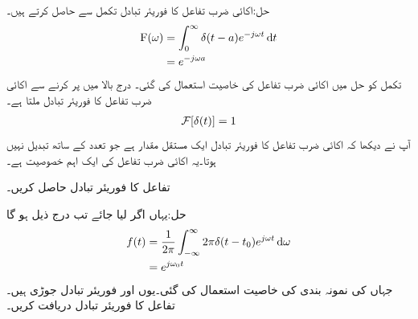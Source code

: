 حل:اکائی ضرب تفاعل کا فوریئر تبادل تکمل سے حاصل کرتے ہیں۔
\begin{gather}
\begin{aligned}
\bF(\omega)&=\int_0^{\infty} \delta(t-a)e^{-j\omega t} \dif t\\
&=e^{-j\omega a}
\end{aligned}
\end{gather}
تکمل کو حل میں اکائی ضرب تفاعل کی  خاصیت استعمال کی گئی۔ درج بالا میں  پر کرنے سے اکائی ضرب تفاعل  کا فوریئر تبادل ملتا ہے۔
\begin{align}
\mathcal{F}[\delta(t)]=1
\end{align}
آپ نے دیکھا کہ اکائی ضرب تفاعل  کا فوریئر تبادل ایک مستقل مقدار ہے جو تعدد کے ساتھ تبدیل نہیں ہوتا۔یہ اکائی ضرب تفاعل کی ایک اہم خصوصیت ہے۔
 
تفاعل  کا فوریئر تبادل حاصل کریں۔

حل:یہاں اگر  لیا جائے تب  درج ذیل ہو گا
\begin{gather}
\begin{aligned}
f(t)&=\frac{1}{2\pi}\int_{-\infty}^{\infty} 2\pi \delta(t-t_0)e^{j\omega t}\dif \omega\\
&=e^{j\omega_0 t}
\end{aligned}
\end{gather} 
جہاں  کی نمونہ بندی کی خاصیت استعمال کی گئی۔یوں  اور  فوریئر تبادل جوڑی ہیں۔ 
تفاعل  کا فوریئر تبادل دریافت کریں۔

